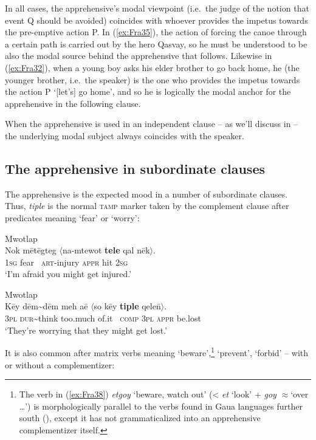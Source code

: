 \documentclass[output=paper,colorlinks,citecolor=brown]{langscibook}
\begin{document}
In all cases, the apprehensive's modal viewpoint (i.e.\ the judge of the notion that event Q should be avoided) coincides with whoever provides the impetus towards the pre-emptive action P. In (\ref{ex:Fra35}), the action of forcing the canoe through a certain path is carried out by the hero Qasvay, so he must be understood to be also the modal source behind the apprehensive that follows. Likewise in (\ref{ex:Fra32}), when a young boy asks his elder brother to go back home, he (the younger brother, i.e.\ the speaker) is the one who provides the impetus towards the action P `[let's] go home', and so he is logically the modal anchor for the apprehensive in the following clause.

When the apprehensive is used in an independent clause -- as we'll discuss in  -- the underlying modal subject always coincides with the speaker.



\subsection{The apprehensive in subordinate clauses}
\label{subsec:subordinate}
 
The apprehensive is the expected mood in a number of subordinate clauses. Thus, \textit{tiple} is the normal \textsc{tamp} marker taken by the complement clause after predicates meaning `fear' or `worry':

\ea \label{ex:Fra36} \textnormal{Mwotlap} \francoissource{{[Emails.2014-04-22]}} \\
\gll Nok mētēgteg ${\langle}$na-mtewot \textbf{tele} qal nēk${\rangle}$. \\
\textsc{1sg} fear ~\textsc{art}-injury \textsc{appr} hit \textsc{2sg} \\
\glt `I'm afraid you might get injured.' 
\z


\ea \label{ex:Fra37} \textnormal{Mwotlap}  \\
\gll Kēy dēm\textasciitilde dēm meh aē ${\langle}$so kēy \textbf{tiple} qele\={n}${\rangle}$. \\
\textsc{3pl} \textsc{dur}\textasciitilde think too.much of.it ~\textsc{comp} \textsc{3pl} \textsc{appr} be.lost \\
\glt `They're worrying that they might get lost.' 
\z

 It is also common after matrix verbs meaning `beware',\footnote{The verb in (\ref{ex:Fra38}) \textit{etgoy} `beware, watch out' (< \textit{et} `look' + \textit{goy} ${\approx}$`over {\ldots}') is morphologically parallel to the verbs found in Gaua languages further south (), except it has not grammaticalized into an apprehensive complementizer itself.} `prevent', `forbid' -- with or without a complementizer:
\end{document}
